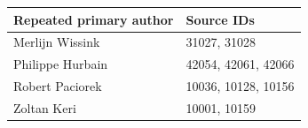 \begin{tabular}{@{}ll@{}}
\toprule
Repeated primary author & Source IDs\\
\midrule
Merlijn Wissink & 31027, 31028\\
Philippe Hurbain & 42054, 42061, 42066\\
Robert Paciorek & 10036, 10128, 10156\\
Zoltan Keri & 10001, 10159\\
\bottomrule
\end{tabular}
